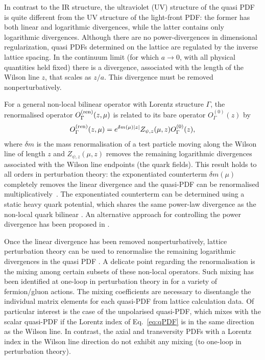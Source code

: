 \begin{itemize}
In contrast to the IR structure, the ultraviolet (UV) structure of the quasi PDF is quite different from the UV structure of the light-front PDF: the former has both linear and logarithmic divergences, while the latter contains only logarithmic divergences. Although there are no power-divergences in dimensional regularization, quasi PDFs determined on the lattice are regulated by the inverse lattice spacing. In the continuum limit (for which $a\to 0$, with all physical quantities held fixed) there is a divergence, associated with the length of the Wilson line $z$, that scales as $z/a$. This divergence must be removed nonperturbatively.

For a general non-local bilinear operator with Lorentz structure $\Gamma$, the renormalised operator $O_{\Gamma}^{\rm (ren)}(z,\mu)$ is
related to its bare operator $O^{(0)}_{\Gamma}(z)$ by \cite{Dotsenko:1979wb, Arefeva:1980zd, Craigie:1980qs,Dorn:1986dt}
\begin{eqnarray}\label{eq:renorm_non-local}
O_{\Gamma}^{\rm (ren)}(z,\mu)=e^{\delta m(\mu)|z|}Z_{\psi, z}(\mu,z)O^{(0)}_{\Gamma}(z),
\end{eqnarray}
where $\delta m$ is the mass renormalisation of a test particle moving along the Wilson line of length $z$ and $Z_{\psi, z}(\mu,z)$ removes the remaining logarithmic divergences associated with the Wilson line endpoints (the quark fields). This result holds to all orders in perturbation theory: the exponentiated counterterm $\delta m(\mu)$ completely removes the linear divergence and the quasi-PDF can be renormalised multiplicatively~\cite{Ji:2015jwa,Ji:2017oey}. The exponentiated counterterm can be determined using a static heavy quark potential, which shares the same power-law divergence as the non-local quark bilinear \cite{Musch:2010ka,Ishikawa:2016znu, Chen:2016fxx}. An alternative approach for controlling the power divergence has been proposed in \cite{Monahan:2016bvm}.

Once the linear divergence has been removed nonperturbatively, lattice perturbation theory can be used to renormalise the remaining logarithmic divergences in the quasi PDF \cite{Ishikawa:2016znu, Carlson:2017gpk}. A delicate point regarding the renormalisation is the mixing among certain subsets of these non-local operators. Such mixing has been identified at one-loop in perturbation theory in \cite{Constantiou:2017soon} for a variety of fermion/gluon actions. The mixing coefficients are necessary to disentangle the individual matrix elements for each quasi-PDF from lattice calculation data. Of particular interest is the case of the unpolarised quasi-PDF, which mixes with the scalar quasi-PDF if the Lorentz index of Eq.~\eqref{eq:qPDF} is in the same direction as the Wilson line. In contrast, the axial and transversity PDFs with a Lorentz index in the Wilson line direction do not exhibit any mixing (to one-loop in perturbation theory). 


\end{itemize}
